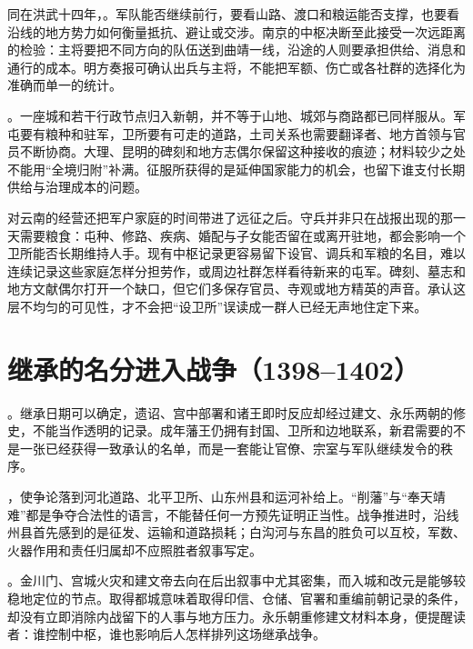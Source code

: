同在洪武十四年，。军队能否继续前行，要看山路、渡口和粮运能否支撑，也要看沿线的地方势力如何衡量抵抗、避让或交涉。南京的中枢决断至此接受一次远距离的检验：主将要把不同方向的队伍送到曲靖一线，沿途的人则要承担供给、消息和通行的成本。明方奏报可确认出兵与主将，不能把军额、伤亡或各社群的选择化为准确而单一的统计。

。一座城和若干行政节点归入新朝，并不等于山地、城郊与商路都已同样服从。军屯要有粮种和驻军，卫所要有可走的道路，土司关系也需要翻译者、地方首领与官员不断协商。大理、昆明的碑刻和地方志偶尔保留这种接收的痕迹；材料较少之处不能用“全境归附”补满。征服所获得的是延伸国家能力的机会，也留下谁支付长期供给与治理成本的问题。

对云南的经营还把军户家庭的时间带进了远征之后。守兵并非只在战报出现的那一天需要粮食：屯种、修路、疾病、婚配与子女能否留在或离开驻地，都会影响一个卫所能否长期维持人手。现有中枢记录更容易留下设官、调兵和军粮的名目，难以连续记录这些家庭怎样分担劳作，或周边社群怎样看待新来的屯军。碑刻、墓志和地方文献偶尔打开一个缺口，但它们多保存官员、寺观或地方精英的声音。承认这层不均匀的可见性，才不会把“设卫所”误读成一群人已经无声地住定下来。

\section{继承的名分进入战争（1398--1402）}

。继承日期可以确定，遗诏、宫中部署和诸王即时反应却经过建文、永乐两朝的修史，不能当作透明的记录。成年藩王仍拥有封国、卫所和边地联系，新君需要的不是一张已经获得一致承认的名单，而是一套能让官僚、宗室与军队继续发令的秩序。

，使争论落到河北道路、北平卫所、山东州县和运河补给上。“削藩”与“奉天靖难”都是争夺合法性的语言，不能替任何一方预先证明正当性。战争推进时，沿线州县首先感到的是征发、运输和道路损耗；白沟河与东昌的胜负可以互校，军数、火器作用和责任归属却不应照胜者叙事写定。

。金川门、宫城火灾和建文帝去向在后出叙事中尤其密集，而入城和改元是能够较稳地定位的节点。取得都城意味着取得印信、仓储、官署和重编前朝记录的条件，却没有立即消除内战留下的人事与地方压力。永乐朝重修建文材料本身，便提醒读者：谁控制中枢，谁也影响后人怎样排列这场继承战争。


